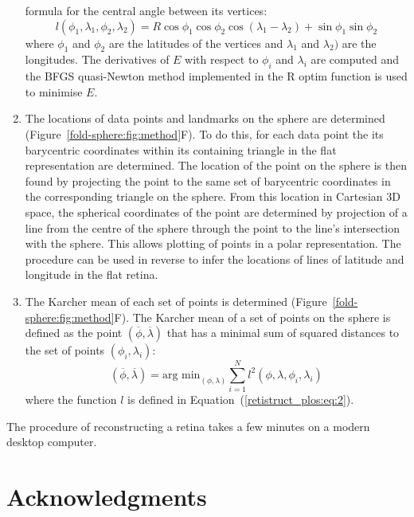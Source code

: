 \documentclass[10pt]{article}
\begin{document}
\begin{enumerate}
  formula for the central angle between its vertices:
  \begin{equation}
    \label{retistruct_plos:eq:2}
    l(\phi_1, \lambda_1, \phi_2, \lambda_2) =
    R\cos\phi_1\cos\phi_2\cos(\lambda_1-\lambda_2) +
    \sin\phi_1\sin\phi_2   
  \end{equation}
  where $\phi_1$ and $\phi_2$ are the latitudes of the vertices and
  $\lambda_1$ and $\lambda_2)$ are the longitudes.  The derivatives of
  $E$ with respect to $\phi_i$ and $\lambda_i$ are computed and the
  BFGS quasi-Newton method implemented in the R optim function is used
  to minimise $E$.
\item The locations of data points and landmarks on the sphere are
  determined (Figure~\ref{fold-sphere:fig:method}F). To do this, for
  each data point the its barycentric coordinates within its containing
  triangle in the flat representation are determined.  The location of
  the point on the sphere is then found by projecting the point to the
  same set of barycentric coordinates in the corresponding triangle on
  the sphere. From this location in Cartesian 3D space, the spherical
  coordinates of the point are determined by projection of a line from
  the centre of the sphere through the point to the line's
  intersection with the sphere. This allows plotting of points in a
  polar representation. The procedure can be used in reverse to infer
  the locations of lines of latitude and longitude in the flat
  retina.
\item The Karcher mean of each set of points is determined
  (Figure~\ref{fold-sphere:fig:method}F). The Karcher mean of a set of
  points on the sphere \cite{Karc77riem,HeoSmal06form} is defined as
  the point $(\overline{\phi}, \overline{\lambda})$ that has a minimal
  sum of squared distances to the set of points $(\phi_i, \lambda_i)$:
  \begin{equation}
    \label{retistruct_plos:eq:3}
    (\overline{\phi}, \overline{\lambda}) = \mbox{arg min}_{(\phi,
      \lambda)} \sum_{i=1}^N l^2(\phi, \lambda, \phi_i, \lambda_i)
  \end{equation}
  where the function $l$ is defined in
  Equation~(\ref{retistruct_plos:eq:2}).
\end{enumerate}

The procedure of reconstructing a retina takes a few minutes on a
modern desktop computer.

\section*{Acknowledgments}
\end{document}
